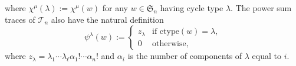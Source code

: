 \documentclass[12pt]{amsart}
\numberwithin{equation}{section}
\newcommand{\sn}{\mathfrak{S}_n}
\newcommand{\defeq}{:=}
\newcommand{\tr}{{\negthickspace \top \negthickspace}}
\newcommand{\ctype}{\mathrm{ctype}}
\newcommand{\trspace}[1]{\mathcal{T}_{#1}}
\begin{document}
where $\chi^\mu(\lambda) \defeq \chi^\mu(w)$
for any $w \in \sn$ having cycle type $\lambda$.
 The power sum traces of $\trspace n$
also have the natural definition
\begin{equation}\label{eq:psidef}
  \psi^\lambda(w) \defeq \begin{cases}
    z_\lambda &\text{if $\ctype(w) = \lambda$},\\
    0 &\text{otherwise},
  \end{cases}
\end{equation}
where $z_\lambda = \lambda_1 \cdots \lambda_\ell \alpha_1! \cdots \alpha_n!$
and $\alpha_i$ is the number of components
of $\lambda$ equal to $i$.
\end{document}
